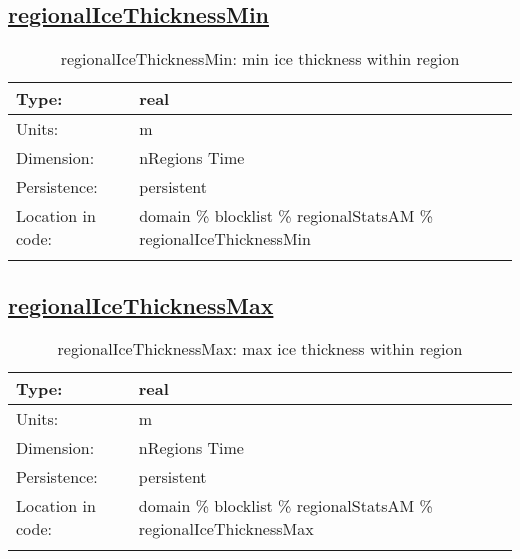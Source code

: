\subsection[regionalIceThicknessMin]{\hyperref[sec:var_tab_regionalStatsAM]{regionalIceThicknessMin}}
\label{subsec:var_sec_regionalStatsAM_regionalIceThicknessMin}
\begin{center}
\begin{longtable}{| p{2.0in} | p{4.0in} |}
        \hline 
        Type: & real \\
        \hline 
        Units: & \si{m} \\
        \hline 
        Dimension: & nRegions Time \\
        \hline 
        Persistence: & persistent \\
        \hline 
         Location in code: & domain \% blocklist \% regionalStatsAM \% regionalIceThicknessMin \\
         \hline 
    \caption{regionalIceThicknessMin: min ice thickness within region}
\end{longtable}
\end{center}
\subsection[regionalIceThicknessMax]{\hyperref[sec:var_tab_regionalStatsAM]{regionalIceThicknessMax}}
\label{subsec:var_sec_regionalStatsAM_regionalIceThicknessMax}
\begin{center}
\begin{longtable}{| p{2.0in} | p{4.0in} |}
        \hline 
        Type: & real \\
        \hline 
        Units: & \si{m} \\
        \hline 
        Dimension: & nRegions Time \\
        \hline 
        Persistence: & persistent \\
        \hline 
         Location in code: & domain \% blocklist \% regionalStatsAM \% regionalIceThicknessMax \\
         \hline 
    \caption{regionalIceThicknessMax: max ice thickness within region}
\end{longtable}
\end{center}
